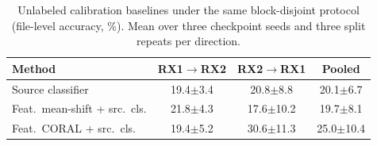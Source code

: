 \begin{table}[t]
\caption{Unlabeled calibration baselines under the same block-disjoint protocol (file-level accuracy, \%). Mean over three checkpoint seeds and three split repeats per direction.}
\label{tab:unlabeled_baselines}
\centering
\small
\begin{tabular}{lccc}
\toprule
Method & RX1$\rightarrow$RX2 & RX2$\rightarrow$RX1 & Pooled \\
\midrule
Source classifier & 19.4$\pm$3.4 & 20.8$\pm$8.8 & 20.1$\pm$6.7 \\
Feat.\ mean-shift + src.\ cls. & 21.8$\pm$4.3 & 17.6$\pm$10.2 & 19.7$\pm$8.1 \\
Feat.\ CORAL + src.\ cls. & 19.4$\pm$5.2 & 30.6$\pm$11.3 & 25.0$\pm$10.4 \\
\bottomrule
\end{tabular}
\end{table}
